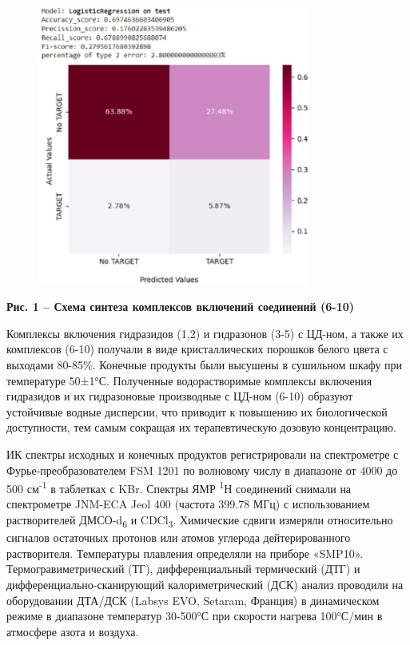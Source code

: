 \begin{figure}[H]
	\centering
	\includegraphics[width=0.8\textwidth]{assets/43}
	\caption*{}
\end{figure}

{\bfseries Рис. 1 -- Схема синтеза комплексов включений соединений (6-10)}

Комплексы включения гидразидов (1,2) и гидразонов (3-5) с ЦД-ном, а
также их комплексов (6-10) получали в виде кристаллических порошков
белого цвета с выходами 80-85\%. Конечные продукты были высушены в
сушильном шкафу при температуре 50±1°С. Полученные водорастворимые
комплексы включения гидразидов и их гидразоновые производные с ЦД-ном
(6-10) образуют устойчивые водные дисперсии, что приводит к повышению их
биологической доступности, тем самым сокращая их терапевтическую дозовую
концентрацию.

ИК спектры исходных и конечных продуктов регистрировали на спектрометре
с Фурье-преобразователем FSM 1201 по волновому числу в диапазоне от 4000
до 500 см\textsuperscript{-1} в таблетках с KBr. Спектры ЯМР
\textsuperscript{1}Н соединений снимали на спектрометре JNM-ECA Jeol 400
(частота 399.78 МГц) с использованием растворителей
ДМСО-d\textsubscript{6} и CDCl\textsubscript{3}. Химические сдвиги
измеряли относительно сигналов остаточных протонов или атомов углерода
дейтерированного растворителя. Температуры плавления определяли на
приборе «SMP10». Термогравиметрический (ТГ), дифференциальный
термический (ДТГ) и дифференциально-сканирующий калориметрический (ДСК)
анализ проводили на оборудовании ДТА/ДСК (Labsys EVO, Setaram, Франция)
в динамическом режиме в диапазоне температур 30-500°С при скорости
нагрева 100°С/мин в атмосфере азота и воздуха.

